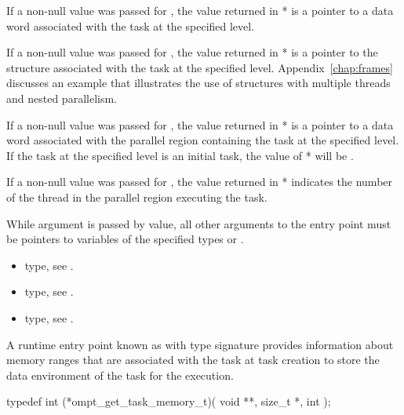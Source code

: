 If a non-null value was passed for ,
the value returned in * is a pointer to a data word
associated with the task at the specified level.

If a non-null value was passed for ,
the value returned in * is a pointer to the
 structure associated with the task at the specified level.
Appendix~\ref{chap:frames} discusses an example that
illustrates the use of  structures with multiple
threads and nested parallelism.

If a non-null value was passed for ,
the value returned in * is a pointer to a data word
associated with the parallel region containing the task at the specified level.
If the task at the specified level is an initial task,
the value of * will be .

If a non-null value was passed for ,
the value returned in *
indicates the number of the thread in the parallel region executing the task.

\constraints
While argument  is passed by
value, all other arguments to the entry point must be pointers
to variables of the specified types or .

\crossreferences
\begin{itemize}
\item {} type, see .
\item {} type, see
  .
\item {} type, see .
\end{itemize}

\label{sec:ompt_get_task_memory_t}
\label{sec:ompt_get_task_memory}

\summary
A runtime entry point known as  
with type signature  provides information 
about memory ranges that are associated with the task at task creation
to store the data environment of the task for the execution.

\format
\begin{ccppspecific}
\begin{omptInquiry}
typedef int (*ompt_get_task_memory_t)(
  void **,
  size_t *,
  int 
);
\end{omptInquiry}
\end{ccppspecific}


